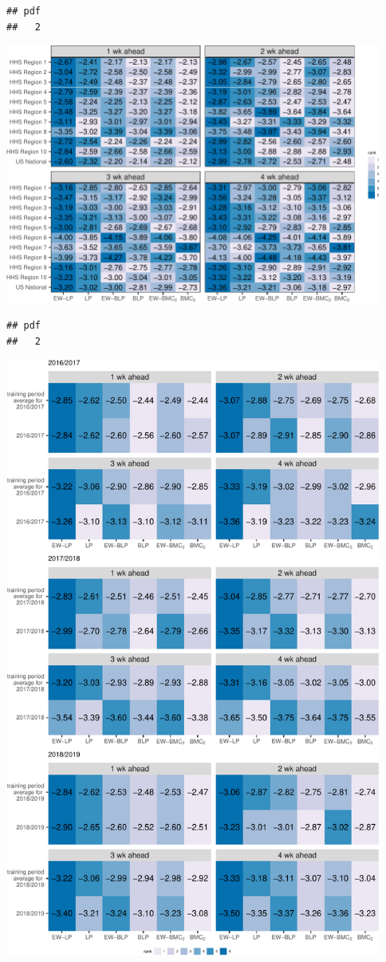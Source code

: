 \documentclass[
]{article}
\begin{document}
\begin{verbatim}
## pdf 
##   2
\end{verbatim}

\includegraphics[width=468px]{plot_calibration_files/figure-latex/lsheatloc3-1}

\begin{verbatim}
## pdf 
##   2
\end{verbatim}

\includegraphics[width=468px]{plot_calibration_files/figure-latex/lsheat1-1}
\end{document}
